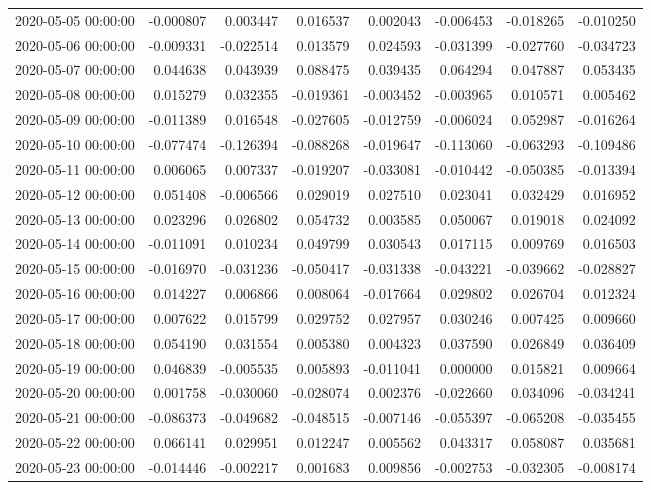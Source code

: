 \begin{tabular}{lrrrrrrr}
2020-05-05 00:00:00 & -0.000807 & 0.003447 & 0.016537 & 0.002043 & -0.006453 & -0.018265 & -0.010250 \\
2020-05-06 00:00:00 & -0.009331 & -0.022514 & 0.013579 & 0.024593 & -0.031399 & -0.027760 & -0.034723 \\
2020-05-07 00:00:00 & 0.044638 & 0.043939 & 0.088475 & 0.039435 & 0.064294 & 0.047887 & 0.053435 \\
2020-05-08 00:00:00 & 0.015279 & 0.032355 & -0.019361 & -0.003452 & -0.003965 & 0.010571 & 0.005462 \\
2020-05-09 00:00:00 & -0.011389 & 0.016548 & -0.027605 & -0.012759 & -0.006024 & 0.052987 & -0.016264 \\
2020-05-10 00:00:00 & -0.077474 & -0.126394 & -0.088268 & -0.019647 & -0.113060 & -0.063293 & -0.109486 \\
2020-05-11 00:00:00 & 0.006065 & 0.007337 & -0.019207 & -0.033081 & -0.010442 & -0.050385 & -0.013394 \\
2020-05-12 00:00:00 & 0.051408 & -0.006566 & 0.029019 & 0.027510 & 0.023041 & 0.032429 & 0.016952 \\
2020-05-13 00:00:00 & 0.023296 & 0.026802 & 0.054732 & 0.003585 & 0.050067 & 0.019018 & 0.024092 \\
2020-05-14 00:00:00 & -0.011091 & 0.010234 & 0.049799 & 0.030543 & 0.017115 & 0.009769 & 0.016503 \\
2020-05-15 00:00:00 & -0.016970 & -0.031236 & -0.050417 & -0.031338 & -0.043221 & -0.039662 & -0.028827 \\
2020-05-16 00:00:00 & 0.014227 & 0.006866 & 0.008064 & -0.017664 & 0.029802 & 0.026704 & 0.012324 \\
2020-05-17 00:00:00 & 0.007622 & 0.015799 & 0.029752 & 0.027957 & 0.030246 & 0.007425 & 0.009660 \\
2020-05-18 00:00:00 & 0.054190 & 0.031554 & 0.005380 & 0.004323 & 0.037590 & 0.026849 & 0.036409 \\
2020-05-19 00:00:00 & 0.046839 & -0.005535 & 0.005893 & -0.011041 & 0.000000 & 0.015821 & 0.009664 \\
2020-05-20 00:00:00 & 0.001758 & -0.030060 & -0.028074 & 0.002376 & -0.022660 & 0.034096 & -0.034241 \\
2020-05-21 00:00:00 & -0.086373 & -0.049682 & -0.048515 & -0.007146 & -0.055397 & -0.065208 & -0.035455 \\
2020-05-22 00:00:00 & 0.066141 & 0.029951 & 0.012247 & 0.005562 & 0.043317 & 0.058087 & 0.035681 \\
2020-05-23 00:00:00 & -0.014446 & -0.002217 & 0.001683 & 0.009856 & -0.002753 & -0.032305 & -0.008174 \\

\end{tabular}
